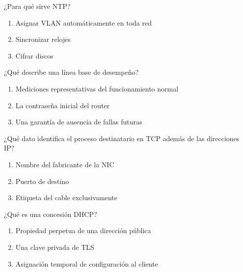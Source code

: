 \noindent\begin{minipage}{\linewidth}\setlength{\parskip}{4pt}\label{q:R-032}
¿Para qué sirve NTP?
\begin{enumerate}[label=\Alph*),nosep]
\item Asignar VLAN automáticamente en toda red
\item Sincronizar relojes
\item Cifrar discos
\end{enumerate}\end{minipage}\par\medskip

\noindent\begin{minipage}{\linewidth}\setlength{\parskip}{4pt}\label{q:R-033}
¿Qué describe una línea base de desempeño?
\begin{enumerate}[label=\Alph*),nosep]
\item Mediciones representativas del funcionamiento normal
\item La contraseña inicial del router
\item Una garantía de ausencia de fallas futuras
\end{enumerate}\end{minipage}\par\medskip

\noindent\begin{minipage}{\linewidth}\setlength{\parskip}{4pt}\label{q:R-034}
¿Qué dato identifica el proceso destinatario en TCP además de las direcciones IP?
\begin{enumerate}[label=\Alph*),nosep]
\item Nombre del fabricante de la NIC
\item Puerto de destino
\item Etiqueta del cable exclusivamente
\end{enumerate}\end{minipage}\par\medskip

\noindent\begin{minipage}{\linewidth}\setlength{\parskip}{4pt}\label{q:R-035}
¿Qué es una concesión DHCP?
\begin{enumerate}[label=\Alph*),nosep]
\item Propiedad perpetua de una dirección pública
\item Una clave privada de TLS
\item Asignación temporal de configuración al cliente
\end{enumerate}\end{minipage}\par\medskip

